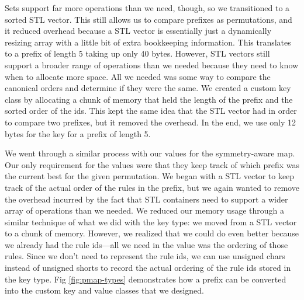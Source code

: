 Sets support far more operations than we need, though, so we transitioned to a sorted STL vector.
This still allows us to compare prefixes as permutations, and it reduced overhead because a STL vector is essentially just a dynamically resizing array with a little bit of extra bookkeeping information.
This translates to a prefix of length 5 taking up only 40 bytes.
However, STL vectors still support a broader range of operations than we needed because they need to know when to allocate more space.
All we needed was some way to compare the canonical orders and determine if they were the same.
We created a custom key class by allocating a chunk of memory that held the length of the prefix and the sorted order of the ids.
This kept the same idea that the STL vector had in order to compare two prefixes, but it removed the overhead.
In the end, we use only 12 bytes for the key for a prefix of length 5.

We went through a similar process with our values for the symmetry-aware map.
Our only requirement for the values were that they keep track of which prefix was the current best for the given permutation.
We began with a STL vector to keep track of the actual order of the rules in the prefix, but we again wanted to remove the overhead incurred by the fact that STL containers need to support a wider array of operations than we needed.
We reduced our memory usage through a similar technique of what we did with the key type: we moved from a STL vector to a chunk of memory.
However, we realized that we could do even better because we already had the rule ids---all we need in the value was the ordering of those rules.
Since we don't need to represent the rule ids, we can use unsigned chars instead of unsigned shorts to record the actual ordering of the rule ids stored in the key type.
Fig \ref{fig:pmap-types} demonstrates how a prefix can be converted into the custom key and value classes that we designed.

